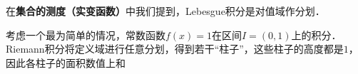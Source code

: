 


在\textbf{集合的测度（实变函数）}中我们提到，Lebesgue积分是对值域作分划．

考虑一个最为简单的情况，常数函数$f(x)=1$在区间$I=(0, 1)$上的积分．Riemann积分将定义域进行任意分划，得到若干“柱子”，这些柱子的高度都是$1$，因此各柱子的面积数值上和













